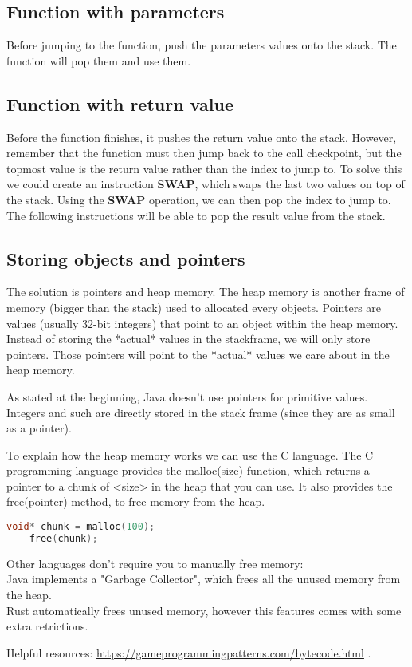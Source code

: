 \documentclass[../documentation.tex]{subfiles}
\begin{document}
\subsection{Function with parameters}

Before jumping to the function, push the parameters values onto the stack.
The function will pop them and use them.

\subsection{Function with return value}

Before the function finishes, it pushes the return value onto the stack.
However, remember that the function must then jump back to the call checkpoint,
but the topmost value is the return value rather than the index to jump to.
To solve this we could create an instruction \textbf{SWAP}, which swaps the last two values on top of the stack.
Using the \textbf{SWAP} operation, we can then pop the index to jump to. The following instructions will be able to pop
the result value from the stack.

\subsection{Storing objects and pointers}

The solution is pointers and heap memory.
The heap memory is another frame of memory (bigger than the stack) used to allocated every objects.
Pointers are values (usually 32-bit integers) that point to an object within the heap memory.
Instead of storing the *actual* values in the stackframe, we will only store pointers.
Those pointers will point to the *actual* values we care about in the heap memory.

As stated at the beginning, Java doesn't use pointers for primitive values. Integers and such
are directly stored in the stack frame (since they are as small as a pointer).

To explain how the heap memory works we can use the C language.
The C programming language provides the malloc(size) function, which returns a pointer to a chunk of <size> in the heap that you can use.
It also provides the free(pointer) method, to free memory from the heap.

\begin{lstlisting}[language=C]
    void* chunk = malloc(100);
    free(chunk);
\end{lstlisting}

Other languages don't require you to manually free memory: \\
Java implements a "Garbage Collector", which frees all the unused memory from the heap. \\
Rust automatically frees unused memory, however this features comes with some extra retrictions.

Helpful resources:
\href{https://gameprogrammingpatterns.com/bytecode.html}{https://gameprogrammingpatterns.com/bytecode.html}
\cite{gameprogrammingpatterns}.


\end{document}
